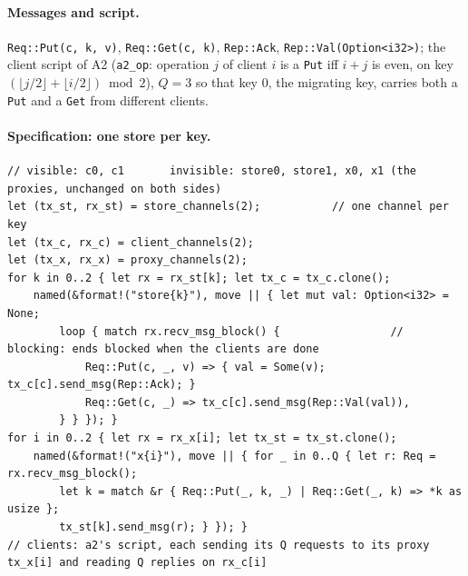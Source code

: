 \documentclass[11pt,a4paper]{article}
\newcommand{\code}[1]{\texttt{#1}}
\begin{document}
\paragraph{Messages and script.} \code{Req::Put(c, k, v)}, \code{Req::Get(c, k)},
\code{Rep::Ack}, \code{Rep::Val(Option<i32>)}; the client script of A2 (\code{a2\_op}: operation
$j$ of client $i$ is a \code{Put} iff $i + j$ is even, on key $(\lfloor j/2 \rfloor + \lfloor i/2
\rfloor) \bmod 2$), $Q = 3$ so that key 0, the migrating key, carries both a \code{Put} and a
\code{Get} from different clients.

\paragraph{Specification: one store per key.}
\begin{lstlisting}
// visible: c0, c1       invisible: store0, store1, x0, x1 (the proxies, unchanged on both sides)
let (tx_st, rx_st) = store_channels(2);           // one channel per key
let (tx_c, rx_c) = client_channels(2);
let (tx_x, rx_x) = proxy_channels(2);
for k in 0..2 { let rx = rx_st[k]; let tx_c = tx_c.clone();
    named(&format!("store{k}"), move || { let mut val: Option<i32> = None;
        loop { match rx.recv_msg_block() {                 // blocking: ends blocked when the clients are done
            Req::Put(c, _, v) => { val = Some(v); tx_c[c].send_msg(Rep::Ack); }
            Req::Get(c, _) => tx_c[c].send_msg(Rep::Val(val)),
        } } }); }
for i in 0..2 { let rx = rx_x[i]; let tx_st = tx_st.clone();
    named(&format!("x{i}"), move || { for _ in 0..Q { let r: Req = rx.recv_msg_block();
        let k = match &r { Req::Put(_, k, _) | Req::Get(_, k) => *k as usize };
        tx_st[k].send_msg(r); } }); }
// clients: a2's script, each sending its Q requests to its proxy tx_x[i] and reading Q replies on rx_c[i]
\end{lstlisting}
\end{document}
